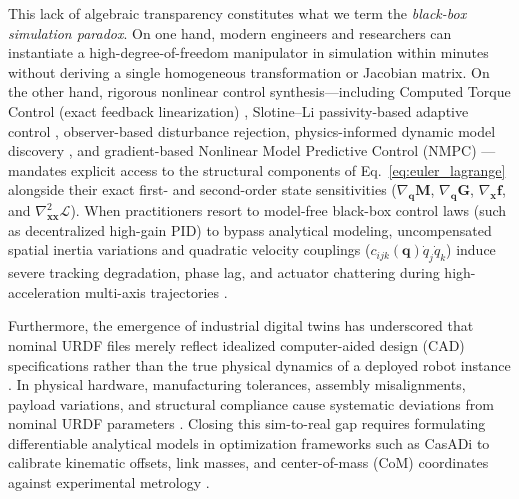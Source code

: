 \documentclass[fleqn,10pt]{article}
\begin{document}
	This lack of algebraic transparency constitutes what we term the \textit{black-box simulation paradox}. On one hand, modern engineers and researchers can instantiate a high-degree-of-freedom manipulator in simulation within minutes without deriving a single homogeneous transformation or Jacobian matrix. On the other hand, rigorous nonlinear control synthesis---including Computed Torque Control (exact feedback linearization) \cite{craig2005introduction, siciliano2010robotics}, Slotine--Li passivity-based adaptive control \cite{slotine1987adaptive}, observer-based disturbance rejection, physics-informed dynamic model discovery \cite{omar2024robust, omar2025rsiel}, and gradient-based Nonlinear Model Predictive Control (NMPC) \cite{andersson2019casadi}---mandates explicit access to the structural components of Eq.~\eqref{eq:euler_lagrange} alongside their exact first- and second-order state sensitivities ($\nabla_{\bm{q}}\bm{M}$, $\nabla_{\bm{q}}\bm{G}$, $\nabla_{\bm{x}}\bm{f}$, and $\nabla_{\bm{x}\bm{x}}^2\mathcal{L}$). When practitioners resort to model-free black-box control laws (such as decentralized high-gain PID) to bypass analytical modeling, uncompensated spatial inertia variations and quadratic velocity couplings ($c_{ijk}(\bm{q})\dot{q}_j\dot{q}_k$) induce severe tracking degradation, phase lag, and actuator chattering during high-acceleration multi-axis trajectories \cite{tadese2022two, sousa2019physical}.
	
	Furthermore, the emergence of industrial digital twins has underscored that nominal URDF files merely reflect idealized computer-aided design (CAD) specifications rather than the true physical dynamics of a deployed robot instance \cite{iliuta2024digital, dimosthenopoulos2024digital, asr2026calibration}. In physical hardware, manufacturing tolerances, assembly misalignments, payload variations, and structural compliance cause systematic deviations from nominal URDF parameters \cite{tadese2022two, zhou2026gtpn}. Closing this sim-to-real gap requires formulating differentiable analytical models in optimization frameworks such as CasADi \cite{andersson2019casadi} to calibrate kinematic offsets, link masses, and center-of-mass (CoM) coordinates against experimental metrology \cite{asr2026calibration, omar2024robust}.
	
\end{document}
